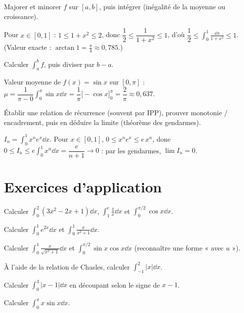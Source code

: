 Majorer et minorer $f$ sur $[a,b]$, puis intégrer (inégalité de la moyenne ou croissance).
\begin{exemple}
Pour $x\in[0,1]$ : $1\le 1+x^2\le 2$, donc $\dfrac12\le\dfrac{1}{1+x^2}\le1$, d'où
$\dfrac12\le\displaystyle\int_0^1\frac{\dd x}{1+x^2}\le1$. (Valeur exacte : $\arctan 1=\tfrac\pi4\approx0{,}785$.)
\end{exemple}

Calculer $\int_a^b f$, puis diviser par $b-a$.
\begin{exemple}
Valeur moyenne de $f(x)=\sin x$ sur $[0,\pi]$ :
$\mu=\dfrac1{\pi-0}\displaystyle\int_0^\pi\sin x\dd x=\dfrac1\pi\big[-\cos x\big]_0^\pi=\dfrac{2}{\pi}\approx0{,}637$.
\end{exemple}

Établir une relation de récurrence (souvent par IPP), prouver monotonie / encadrement, puis en déduire
la limite (théorème des gendarmes).
\begin{exemple}
$I_n=\displaystyle\int_0^1 x^n e^{x}\dd x$. Pour $x\in[0,1]$, $0\le x^n e^x\le e\,x^n$, donc
$0\le I_n\le e\displaystyle\int_0^1 x^n\dd x=\dfrac{e}{n+1}\to0$ : par les gendarmes, $\lim I_n=0$.
\end{exemple}

\section{Exercices d'application}

\exo{} Calculer $\displaystyle\int_0^2(3x^2-2x+1)\dd x$, $\displaystyle\int_1^e\frac{1}{x}\dd x$
et $\displaystyle\int_0^{\pi/2}\cos x\dd x$.

\exo{} Calculer $\displaystyle\int_0^1 e^{2x}\dd x$ et $\displaystyle\int_0^1\frac{x}{x^2+1}\dd x$.

\exo{} Calculer $\displaystyle\int_0^1\frac{x}{\sqrt{x^2+1}}\dd x$ et
$\displaystyle\int_0^{\pi/2}\sin x\cos x\dd x$ (reconnaître une forme « avec $u$ »).

\exo{} À l'aide de la relation de Chasles, calculer $\displaystyle\int_{-1}^{2}|x|\dd x$.

\exo{} Calculer $\displaystyle\int_0^3|x-1|\dd x$ en découpant selon le signe de $x-1$.

\exo{} Calculer $\displaystyle\int_0^{\pi} x\sin x\dd x$.

